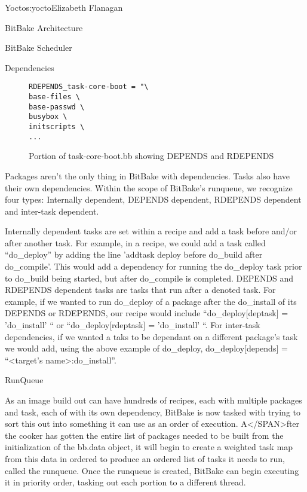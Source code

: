 \begin{aosachapter}{Yocto}{s:yocto}{Elizabeth Flanagan}
\begin{aosasect1}{BitBake Architecture}
\begin{aosasect2}{BitBake Scheduler}
\begin{aosasect3}{Dependencies}
\begin{figure}
\begin{verbatim}
RDEPENDS_task-core-boot = "\
base-files \
base-passwd \
busybox \
initscripts \
...
\end{verbatim}
\caption{Portion of task-core-boot.bb showing DEPENDS and RDEPENDS}
\label{fig.yocto.depends}
\end{figure}

Packages aren't the only thing in BitBake with dependencies. Tasks
also have their own dependencies.  Within the scope of BitBake's
runqueue, we recognize four types: Internally dependent, DEPENDS
dependent, RDEPENDS dependent and inter-task dependent.

Internally dependent tasks are set within a recipe and add a task
before and/or after another task. For example, in a recipe, we could
add a task called ``do\_deploy'' by adding the line 'addtask deploy
before do\_build after do\_compile'.  This would add a dependency for
running the do\_deploy task prior to do\_build being started, but
after do\_compile is completed. DEPENDS and RDEPENDS dependent tasks
are tasks that run after a denoted task.  For example, if we wanted to
run do\_deploy of a package after the do\_install of its DEPENDS or
RDEPENDS, our recipe would include ``do\_deploy[deptask] =
'do\_install' `` or ``do\_deploy[rdeptask] = 'do\_install' ``. For
inter-task dependencies, if we wanted a taks to be dependant on a
different package's task we would add, using the above example of
do\_deploy, do\_deploy[depends] = ``{\textless}target's
name{\textgreater}:do\_install''.

\end{aosasect3}

\begin{aosasect3}{RunQueue}

As an image build out can have hundreds of recipes, each with multiple
packages and task, each of with its own dependency, BitBake is now
tasked with trying to sort this out into something it can use as an
order of execution. A</SPAN>fter the cooker has gotten the entire list
of packages needed to be built from the initialization of the bb.data
object, it will begin to create a weighted task map from this data in
ordered to produce an ordered list of tasks it needs to run, called
the runqueue. Once the runqueue is created, BitBake can begin
executing it in priority order, tasking out each portion to a
different thread.


\end{aosasect3}
\end{aosasect2}
\end{aosasect1}
\end{aosachapter}

